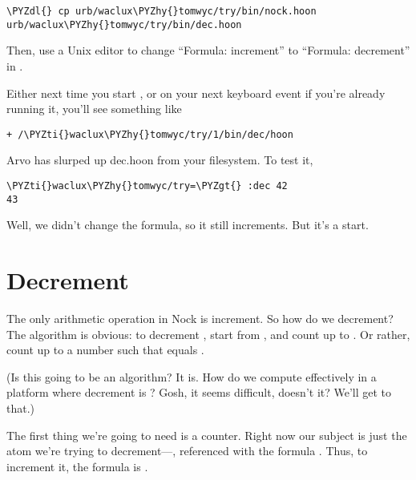 \begin{framed_shaded}
\begin{Verbatim}[fontsize=\relsize{-2.5},fontseries=b,commandchars=\\\{\}]
\PYZdl{} cp urb/waclux\PYZhy{}tomwyc/try/bin/nock.hoon urb/waclux\PYZhy{}tomwyc/try/bin/dec.hoon
\end{Verbatim}
\end{framed_shaded}
Then, use a Unix editor to change ``Formula: increment'' to
``Formula: decrement'' in .

Either next time you start , or on your next keyboard event
if you're already running it, you'll see something like

\begin{framed_shaded}
\begin{Verbatim}[fontsize=\relsize{-2.5},fontseries=b,commandchars=\\\{\}]
 + /\PYZti{}waclux\PYZhy{}tomwyc/try/1/bin/dec/hoon
\end{Verbatim}
\end{framed_shaded}
Arvo has slurped up dec.hoon from your filesystem.  To test it,

\begin{framed_shaded}
\begin{Verbatim}[fontsize=\relsize{-2.5},fontseries=b,commandchars=\\\{\}]
\PYZti{}waclux\PYZhy{}tomwyc/try=\PYZgt{} :dec 42
43
\end{Verbatim}
\end{framed_shaded}
Well, we didn't change the formula, so it still increments.  But
it's a start.

\section{Decrement}

The only arithmetic operation in Nock is increment.  So how do we
decrement?  The algorithm is obvious: to decrement , start
from , and count up to .  Or rather, count up to a number
 such that  equals .

(Is this going to be an  algorithm?  It is.  How do we
compute effectively in a platform where decrement is ?
Gosh, it seems difficult, doesn't it?  We'll get to that.)

The first thing we're going to need is a counter.  Right now
our subject is just the atom we're trying to decrement---,
referenced with the formula \kode{[0 1]}.  Thus, to increment it,
the formula is \kode{[4 0 1]}.

